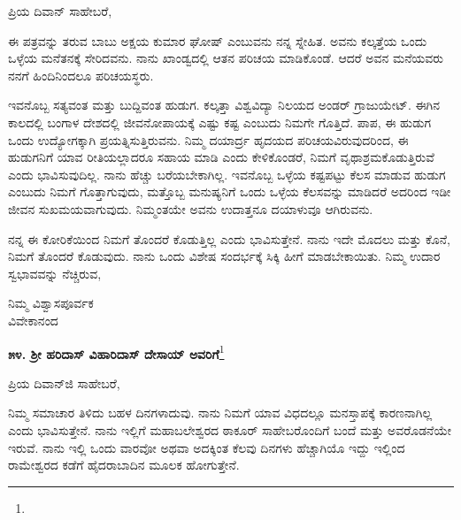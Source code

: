 \begin{flushright}
{\fontsize{11pt}{11pt}\selectfont{ಬೊಂಬಾಯಿ\\[-2pt] ೧೮೯೨}}
\end{flushright}

\vspace{-0.35cm}

\noindent
ಪ್ರಿಯ ದಿವಾನ್ ಸಾಹೇಬರೆ,

ಈ ಪತ್ರವನ್ನು ತರುವ ಬಾಬು ಅಕ್ಷಯ ಕುಮಾರ ಘೋಷ್ ಎಂಬುವನು ನನ್ನ ಸ್ನೇಹಿತ. ಅವನು ಕಲ್ಕತ್ತೆಯ ಒಂದು ಒಳ್ಳೆಯ ಮನೆತನಕ್ಕೆ ಸೇರಿದವನು. ನಾನು ಖಾಂಡ್ವದಲ್ಲಿ ಆತನ ಪರಿಚಯ ಮಾಡಿಕೊಂಡೆ. ಆದರೆ ಅವನ ಮನೆಯವರು ನನಗೆ ಹಿಂದಿನಿಂದಲೂ ಪರಿಚಯಸ್ಥರು.

ಇವನೊಬ್ಬ ಸತ್ಯವಂತ ಮತ್ತು ಬುದ್ದಿವಂತ ಹುಡುಗ. ಕಲ್ಕತ್ತಾ ವಿಶ್ವವಿದ್ಯಾ ನಿಲಯದ ಅಂಡರ್ ಗ್ರಾಜುಯೇಟ್. ಈಗಿನ ಕಾಲದಲ್ಲಿ ಬಂಗಾಳ ದೇಶದಲ್ಲಿ ಜೀವನೋಪಾಯಕ್ಕೆ ಎಷ್ಟು ಕಷ್ಟ ಎಂಬುದು ನಿಮಗೇ ಗೊತ್ತಿದೆ. ಪಾಪ, ಈ ಹುಡುಗ ಒಂದು ಉದ್ಯೋಗಕ್ಕಾಗಿ ಪ್ರಯತ್ನಿಸುತ್ತಿರುವನು. ನಿಮ್ಮ ದಯಾರ್ದ್ರ ಹೃದಯದ ಪರಿಚಯವಿರುವುದರಿಂದ, ಈ ಹುಡುಗನಿಗೆ ಯಾವ ರೀತಿಯಲ್ಲಾದರೂ ಸಹಾಯ ಮಾಡಿ ಎಂದು ಕೇಳಿಕೊಂಡರೆ, ನಿಮಗೆ ವೃಥಾಶ್ರಮಕೊಡುತ್ತಿರುವೆ ಎಂದು ಭಾವಿಸುವುದಿಲ್ಲ. ನಾನು ಹೆಚ್ಚು ಬರೆಯಬೇಕಾಗಿಲ್ಲ. ಇವನೊಬ್ಬ ಒಳ್ಳೆಯ ಕಷ್ಟಪಟ್ಟು ಕೆಲಸ ಮಾಡುವ ಹುಡುಗ ಎಂಬುದು ನಿಮಗೆ ಗೊತ್ತಾಗುವುದು, ಮತ್ತೊಬ್ಬ ಮನುಷ್ಯನಿಗೆ ಒಂದು ಒಳ್ಳೆಯ ಕೆಲಸವನ್ನು ಮಾಡಿದರೆ ಅದರಿಂದ ಇಡೀ ಜೀವನ ಸುಖಮಯವಾಗುವುದು. ನಿಮ್ಮಂತಯೇ ಅವನು ಉದಾತ್ತನೂ ದಯಾಳುವೂ ಆಗಿರುವನು.

ನನ್ನ ಈ ಕೋರಿಕೆಯಿಂದ ನಿಮಗೆ ತೊಂದರೆ ಕೊಡುತ್ತಿಲ್ಲ ಎಂದು ಭಾವಿಸುತ್ತೇನೆ. ನಾನು ಇದೇ ಮೊದಲು ಮತ್ತು ಕೊನೆ, ನಿಮಗೆ ತೊಂದರೆ ಕೊಡುವುದು. ನಾನು ಒಂದು ವಿಶೇಷ ಸಂದರ್ಭಕ್ಕೆ ಸಿಕ್ಕಿ ಹೀಗೆ ಮಾಡಬೇಕಾಯಿತು. ನಿಮ್ಮ ಉದಾರ ಸ್ವಭಾವವನ್ನು ನೆಚ್ಚಿರುವ,

\vspace{-0.35cm}

{\flushright
ನಿಮ್ಮ ವಿಶ್ವಾಸಪೂರ್ವಕ\\ವಿವೇಕಾನಂದ\par}

\begin{center}
\textbf{೫೪. ಶ‍್ರೀ ಹರಿದಾಸ್ ವಿಹಾರಿದಾಸ್ ದೇಸಾಯ್ ಅವರಿಗೆ}\footnote{}
\end{center}

\vspace{-0.65cm}

\begin{flushright}
{\fontsize{11pt}{11pt}\selectfont{ಪೂನಾ\\[-2pt] ೧೫ನೇ ಜೂನ್ ೧೮೯೨}}
\end{flushright}

\vspace{-0.35cm}

\noindent
ಪ್ರಿಯ ದಿವಾನ್‌ಜಿ ಸಾಹೇಬರೆ,

ನಿಮ್ಮ ಸಮಾಚಾರ ತಿಳಿದು ಬಹಳ ದಿನಗಳಾದುವು. ನಾನು ನಿಮಗೆ ಯಾವ ವಿಧದಲ್ಲೂ ಮನಸ್ತಾಪಕ್ಕೆ ಕಾರಣನಾಗಿಲ್ಲ ಎಂದು ಭಾವಿಸುತ್ತೇನೆ. ನಾನು ಇಲ್ಲಿಗೆ ಮಹಾಬಲೇಶ್ವರದ ಠಾಕೂರ್ ಸಾಹೇಬರೊಂದಿಗೆ ಬಂದೆ ಮತ್ತು ಅವರೊಡನೆಯೇ ಇರುವೆ. ನಾನು ಇಲ್ಲಿ ಒಂದು ವಾರವೋ ಅಥವಾ ಅದಕ್ಕಿಂತ ಕೆಲವು ದಿನಗಳು ಹೆಚ್ಚಾಗಿಯೊ ಇದ್ದು ಇಲ್ಲಿಂದ ರಾಮೇಶ್ವರದ ಕಡೆಗೆ ಹೈದರಾಬಾದಿನ ಮೂಲಕ ಹೋಗುತ್ತೇನೆ.

